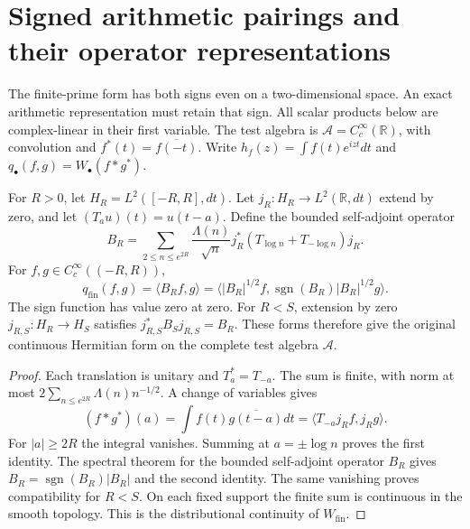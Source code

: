\section{Signed arithmetic pairings and their operator representations}
\label{v4-arith:sc:comparison}

The finite-prime form has both signs even on a two-dimensional space.
An exact arithmetic representation must retain that sign.
All scalar products below are complex-linear in their first variable.
The test algebra is $\mathscr A=C_c^\infty(\mathbb R)$, with convolution
and $f^*(t)=\overline{f(-t)}$.
Write $h_f(z)=\int f(t)e^{izt}dt$ and
$q_\bullet(f,g)=W_\bullet(f*g^*)$.

\begin{theorem}
\label{v4-arith:sc:prime-operator}
For $R>0$, let $H_R=L^2([-R,R],dt)$.
Let $j_R:H_R\to L^2(\mathbb R,dt)$ extend by zero, and let
$(T_a u)(t)=u(t-a)$.
Define the bounded self-adjoint operator
\[
 B_R=\sum_{2\le n\le e^{2R}}\frac{\Lambda(n)}{\sqrt n}
          j_R^*(T_{\log n}+T_{-\log n})j_R .
\]
For $f,g\in C_c^\infty((-R,R))$,
\begin{equation}
 q_{\mathrm{fin}}(f,g)=\langle B_Rf,g\rangle
 =\langle |B_R|^{1/2}f,\operatorname{sgn}(B_R)|B_R|^{1/2}g\rangle.
 \label{v4-arith:sc:prime-comparison}
\end{equation}
The sign function has value zero at zero.
For $R<S$, extension by zero $j_{R,S}:H_R\to H_S$ satisfies
$j_{R,S}^*B_Sj_{R,S}=B_R$.
These forms therefore give the original continuous Hermitian form on
the complete test algebra $\mathscr A$.
\end{theorem}
\begin{proof}
Each translation is unitary and $T_a^*=T_{-a}$.
The sum is finite, with norm at most
$2\sum_{n\le e^{2R}}\Lambda(n)n^{-1/2}$.
A change of variables gives
\[
 (f*g^*)(a)=\int f(t)\overline{g(t-a)}dt
           =\langle T_{-a}j_Rf,j_Rg\rangle.
\]
For $|a|\ge2R$ the integral vanishes. Summing at
$a=\pm\log n$ proves the first identity.
The spectral theorem for the bounded self-adjoint operator $B_R$
gives $B_R=\operatorname{sgn}(B_R)|B_R|$ and the second identity.
The same vanishing proves compatibility for $R<S$.
On each fixed support the finite sum is continuous in the smooth
topology. This is the distributional continuity of $W_{\mathrm{fin}}$.
\end{proof}

